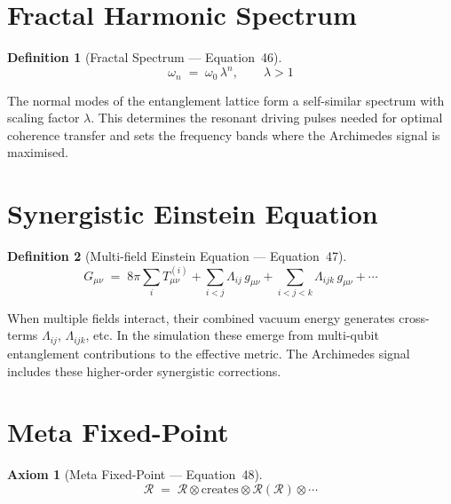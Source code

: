 \documentclass[11pt,a4paper]{article}
\newtheorem{axiom}{Axiom}
\newtheorem{definition}{Definition}[section]
\theoremstyle{remark}
\newcommand{\CalR}{\mathcal{R}}
\begin{document}
\section{Fractal Harmonic Spectrum}
\label{sec:eq46}

\begin{definition}[Fractal Spectrum --- Equation~46]
\begin{equation}\label{eq:fractalspec}
    \omega_n \;=\; \omega_0\,\lambda^n, \qquad \lambda > 1
\end{equation}
\end{definition}

The normal modes of the entanglement lattice form a self-similar spectrum with scaling factor $\lambda$.  This determines the resonant driving pulses needed for optimal coherence transfer and sets the frequency bands where the Archimedes signal is maximised.

\section{Synergistic Einstein Equation}
\label{sec:eq47}

\begin{definition}[Multi-field Einstein Equation --- Equation~47]
\begin{equation}\label{eq:synergy}
    G_{\mu\nu} \;=\; 8\pi\!\sum_i T_{\mu\nu}^{(i)}
    + \sum_{i<j}\Lambda_{ij}\, g_{\mu\nu}
    + \sum_{i<j<k}\Lambda_{ijk}\, g_{\mu\nu} + \cdots
\end{equation}
\end{definition}

When multiple fields interact, their combined vacuum energy generates cross-terms $\Lambda_{ij}$, $\Lambda_{ijk}$, etc.  In the simulation these emerge from multi-qubit entanglement contributions to the effective metric.  The Archimedes signal includes these higher-order synergistic corrections.

\section{Meta Fixed-Point}
\label{sec:eq48}

\begin{axiom}[Meta Fixed-Point --- Equation~48]
\begin{equation}\label{eq:metafp}
    \CalR \;=\; \CalR \otimes \text{creates} \otimes \CalR(\CalR) \otimes \cdots
\end{equation}
\end{axiom}
\end{document}
